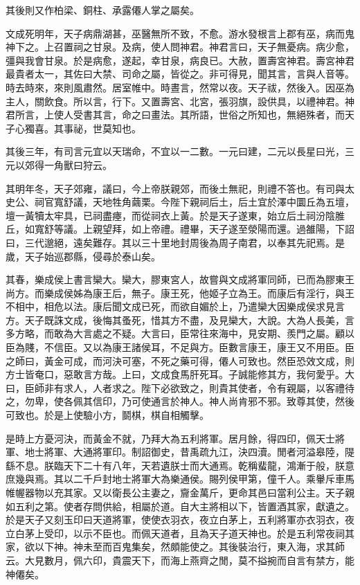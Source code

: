 其後則又作柏梁、銅柱、承露僊人掌之屬矣。

文成死明年，天子病鼎湖甚，巫醫無所不致，不愈。游水發根言上郡有巫，病而鬼神下之。上召置祠之甘泉。及病，使人問神君。神君言曰，天子無憂病。病少愈，彊與我會甘泉。於是病愈，遂起，幸甘泉，病良已。大赦，置壽宮神君。壽宮神君最貴者太一，其佐曰大禁、司命之屬，皆從之。非可得見，聞其言，言與人音等。時去時來，來則風肅然。居室帷中。時晝言，然常以夜。天子祓，然後入。因巫為主人，關飲食。所以言，行下。又置壽宮、北宮，張羽旗，設供具，以禮神君。神君所言，上使人受書其言，命之曰畫法。其所語，世俗之所知也，無絕殊者，而天子心獨喜。其事祕，世莫知也。

其後三年，有司言元宜以天瑞命，不宜以一二數。一元曰建，二元以長星曰光，三元以郊得一角獸曰狩云。

其明年冬，天子郊雍，議曰，今上帝朕親郊，而後土無祀，則禮不答也。有司與太史公、祠官寬舒議，天地牲角繭栗。今陛下親祠后土，后土宜於澤中圜丘為五壇，壇一黃犢太牢具，已祠盡瘞，而從祠衣上黃。於是天子遂東，始立后土祠汾陰脽丘，如寬舒等議。上親望拜，如上帝禮。禮畢，天子遂至滎陽而還。過雒陽，下詔曰，三代邈絕，遠矣難存。其以三十里地封周後為周子南君，以奉其先祀焉。是歲，天子始巡郡縣，侵尋於泰山矣。

其春，樂成侯上書言欒大。欒大，膠東宮人，故嘗與文成將軍同師，已而為膠東王尚方。而樂成侯姊為康王后，無子。康王死，他姬子立為王。而康后有淫行，與王不相中，相危以法。康后聞文成已死，而欲自媚於上，乃遣欒大因樂成侯求見言方。天子既誅文成，後悔其蚤死，惜其方不盡，及見欒大，大說。大為人長美，言多方略，而敢為大言處之不疑。大言曰，臣常往來海中，見安期、羨門之屬。顧以臣為賤，不信臣。又以為康王諸侯耳，不足與方。臣數言康王，康王又不用臣。臣之師曰，黃金可成，而河決可塞，不死之藥可得，僊人可致也。然臣恐效文成，則方士皆奄口，惡敢言方哉。上曰，文成食馬肝死耳。子誠能修其方，我何愛乎。大曰，臣師非有求人，人者求之。陛下必欲致之，則貴其使者，令有親屬，以客禮待之，勿卑，使各佩其信印，乃可使通言於神人。神人尚肯邪不邪。致尊其使，然後可致也。於是上使驗小方，鬬棋，棋自相觸擊。

是時上方憂河決，而黃金不就，乃拜大為五利將軍。居月餘，得四印，佩天士將軍、地士將軍、大通將軍印。制詔御史，昔禹疏九江，決四瀆。閒者河溢皋陸，隄繇不息。朕臨天下二十有八年，天若遺朕士而大通焉。乾稱蜚龍，鴻漸于般，朕意庶幾與焉。其以二千戶封地士將軍大為樂通侯。賜列侯甲第，僮千人。乘轝斥車馬帷幄器物以充其家。又以衛長公主妻之，齎金萬斤，更命其邑曰當利公主。天子親如五利之第。使者存問供給，相屬於道。自大主將相以下，皆置酒其家，獻遺之。於是天子又刻玉印曰天道將軍，使使衣羽衣，夜立白茅上，五利將軍亦衣羽衣，夜立白茅上受印，以示不臣也。而佩天道者，且為天子道天神也。於是五利常夜祠其家，欲以下神。神未至而百鬼集矣，然頗能使之。其後裝治行，東入海，求其師云。大見數月，佩六印，貴震天下，而海上燕齊之閒，莫不搤捥而自言有禁方，能神僊矣。

